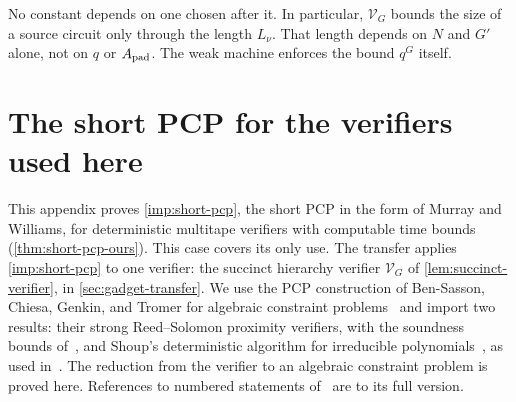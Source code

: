 \documentclass[11pt,letterpaper]{article}
\theoremstyle{definition}
\theoremstyle{remark}
\begin{document}
No constant depends on one chosen after it. In particular,
\(\mathcal V_G\) bounds the size of a source circuit only through the
length \(L_\nu\). That length depends on \(N\) and \(G'\) alone, not on
\(q\) or \(A_{\rm pad}\). The weak machine enforces the bound \(q^G\)
itself.

\section{The short PCP for the verifiers used here}\label{app:short-pcp-proof}

This appendix proves \cref{imp:short-pcp}, the short PCP in the form of
Murray and Williams, for deterministic multitape verifiers with
computable time bounds (\cref{thm:short-pcp-ours}). This case covers its
only use. The transfer applies \cref{imp:short-pcp} to one verifier: the
succinct hierarchy verifier \(\mathcal V_G\) of
\cref{lem:succinct-verifier}, in \cref{sec:gadget-transfer}.
We use the PCP construction of Ben-Sasson, Chiesa, Genkin, and Tromer
for algebraic constraint problems~\cite{BCGT13} and import two
results: their strong Reed--Solomon proximity verifiers, with the
soundness bounds of~\cite[Theorem~11.1]{BCGT13}, and Shoup's deterministic
algorithm for irreducible polynomials~\cite[Corollary~3.2]{Sho88}, as
used in~\cite[Algorithm~17]{BCGT13}. The reduction from the verifier to
an algebraic constraint problem is proved here. References to numbered
statements of~\cite{BCGT13} are to its full version.
\end{document}
